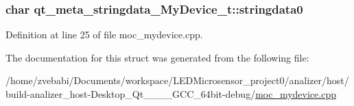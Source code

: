 \hypertarget{structqt__meta__stringdata___my_device__t_af8cfff3ab861a8d6e52b4e876dbb73e6}{
\subsubsection[{stringdata0}]{\setlength{\rightskip}{0pt plus 5cm}char qt\+\_\+meta\+\_\+stringdata\+\_\+\+My\+Device\+\_\+t\+::stringdata0}}\label{structqt__meta__stringdata___my_device__t_af8cfff3ab861a8d6e52b4e876dbb73e6}


Definition at line 25 of file moc\+\_\+mydevice.\+cpp.



The documentation for this struct was generated from the following file\+:\begin{DoxyCompactItemize}
\item 
/home/zvebabi/\+Documents/workspace/\+L\+E\+D\+Microsensor\+\_\+project0/analizer/host/build-\/analizer\+\_\+host-\/\+Desktop\+\_\+\+Qt\+\_\+\_\+\_\+\_\+\+G\+C\+C\+\_\+64bit-\/debug/\hyperlink{build-analizer__host-_desktop___qt__5__9__0___g_c_c__64bit-debug_2moc__mydevice_8cpp}{moc\+\_\+mydevice.\+cpp}\end{DoxyCompactItemize}
